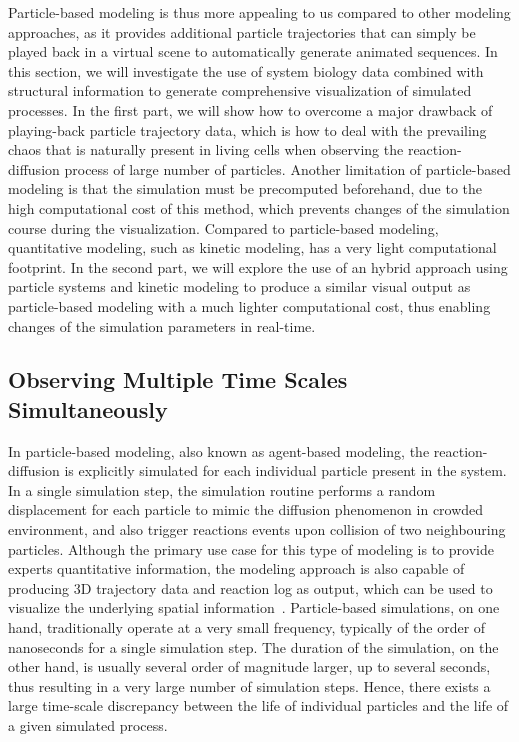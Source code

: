Particle-based modeling is thus more appealing to us compared to other modeling approaches, as it provides additional particle trajectories that can simply be played back in a virtual scene to automatically generate animated sequences.
In this section, we will investigate the use of system biology data combined with structural information to generate comprehensive visualization of simulated processes.
In the first part, we will show how to overcome a major drawback of playing-back particle trajectory data, which is how to deal with the prevailing chaos that is naturally present in living cells when observing the reaction-diffusion process of large number of particles.
Another limitation of particle-based modeling is that the simulation must be precomputed beforehand, due to the high computational cost of this method, which prevents changes of the simulation course during the visualization.
Compared to particle-based modeling, quantitative modeling, such as kinetic modeling, has a very light computational footprint.
In the second part, we will explore the use of an hybrid approach using particle systems and kinetic modeling to produce a similar visual output as particle-based modeling with a much lighter computational cost, thus enabling changes of the simulation parameters in real-time. 

\subsection{Observing Multiple Time Scales Simultaneously}

In particle-based modeling, also known as agent-based modeling, the reaction-diffusion is explicitly simulated for each individual particle present in the system.
In a single simulation step, the simulation routine performs a random displacement for each particle to mimic the diffusion phenomenon in crowded environment, and also trigger reactions events upon collision of two neighbouring particles.
Although the primary use case for this type of modeling is to provide experts quantitative information, the modeling approach is also capable of producing 3D trajectory data and reaction log as output, which can be used to visualize the underlying spatial information~\cite{falk2009visualization}.
Particle-based simulations, on one hand, traditionally operate at a very small frequency, typically of the order of nanoseconds for a single simulation step.  
The duration of the simulation, on the other hand, is usually several order of magnitude larger, up to several seconds, thus resulting in a very large number of simulation steps.
Hence, there exists a large time-scale discrepancy between the life of individual particles and the life of a given simulated process.

